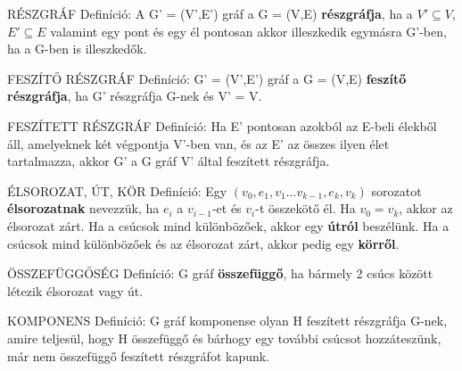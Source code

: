 \documentclass[]{article}
\begin{document}
\begin{shaded}
RÉSZGRÁF Definíció: A G' = (V',E') gráf a G = (V,E) \textbf{részgráfja}, ha a $V' \subseteq V$, $E' \subseteq E$ valamint egy pont és egy él pontosan akkor illeszkedik egymásra G'-ben, ha a G-ben is illeszkedők.
\end{shaded}
\begin{shaded}
FESZÍTŐ RÉSZGRÁF Definíció: G' = (V',E') gráf a G = (V,E)\textbf{ feszítő részgráfja}, ha G' részgráfja G-nek és V' = V.
\end{shaded}
\begin{shaded}
FESZÍTETT RÉSZGRÁF Definíció: Ha E' pontosan azokból az E-beli élekből áll, amelyeknek két végpontja V'-ben van, és az E' az összes ilyen élet tartalmazza, akkor G' a G gráf V' által feszített részgráfja.
\end{shaded}
\begin{shaded}
ÉLSOROZAT, ÚT, KÖR Definíció: Egy $(v_0, e_1, v_1 ... v_{k-1}, e_k, v_k)$ sorozatot \textbf{élsorozatnak} nevezzük, ha $e_i$ a $v_{i-1}$-et és $v_i$-t összekötő él. Ha $v_0 = v_k$, akkor az élsorozat zárt. Ha a csúcsok mind különbözőek, akkor egy \textbf{útról} beszélünk. Ha a csúcsok mind különbözőek és az élsorozat zárt, akkor pedig egy \textbf{körről}.
\end{shaded}
\begin{shaded}
ÖSSZEFÜGGŐSÉG Definíció: G gráf \textbf{összefüggő}, ha bármely 2 csúcs között létezik élsorozat vagy út.
\end{shaded}
\begin{shaded}
KOMPONENS Definíció: G gráf komponense olyan H feszített részgráfja G-nek, amire teljesül, hogy H összefüggő és bárhogy egy további csúcsot hozzáteszünk, már nem összefüggő feszített részgráfot kapunk.
\end{shaded}
\end{document}
